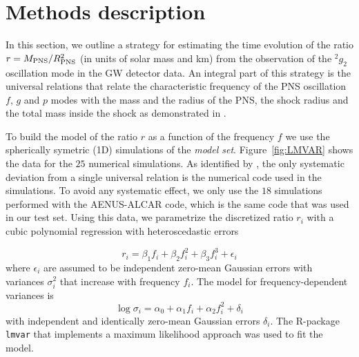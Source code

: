 \section{Methods description}
\label{methods}

In this section, we outline a strategy for estimating the time evolution of the
ratio $r=M_{\rm PNS}/R_{\rm PNS}^2$ (in units of solar mass and km) from the observation of the $\mbox{}^2g_2$
oscillation mode in the GW detector data.
An integral part of this strategy is the universal relations that relate the
characteristic frequency of the PNS oscillation $f$, $g$ and $p$ modes with the mass
and the radius of the PNS, the shock radius and the total mass inside the shock as
demonstrated in \cite{Torres:2019b}.

To build the model of the ratio $r$ as a function of the frequency $f$ we use the 
spherically symetric (1D) simulations of the {\it model set}. Figure~\ref{fig:LMVAR}
shows the data for the $25$ numerical simulations. As identified by \cite{Torres:2019b}, the only systematic
deviation from a single universal relation is the numerical code used in the simulations. 
To avoid any systematic effect, we only use the $18$ simulations performed with the {\sc AENUS-ALCAR}
code, which is the same code that was used in our test set.
Using this data, we parametrize the discretized ratio $r_i$ with a cubic polynomial
regression with heteroscedastic errors

\begin{equation}
\label{eq:model1}
r_i=\beta_1 f_i + \beta_2 f_i^2 +\beta_3 f_i^3 + \epsilon_i
\end{equation}
where $\epsilon_i$ are assumed to be independent zero-mean Gaussian errors with
variances $\sigma_i^2$ that increase with frequency $f_i$. The model for frequency-dependent
variances is
\begin{equation}
\log \sigma_i=\alpha_0+ \alpha_1 f_i + \alpha_2 f_i^2 + \delta_i
\end{equation}
with independent and identically zero-mean Gaussian errors $\delta_i$. The R-package \texttt{lmvar}
\cite{lmvar:2019} that implements a maximum likelihood approach was used to fit the model.

